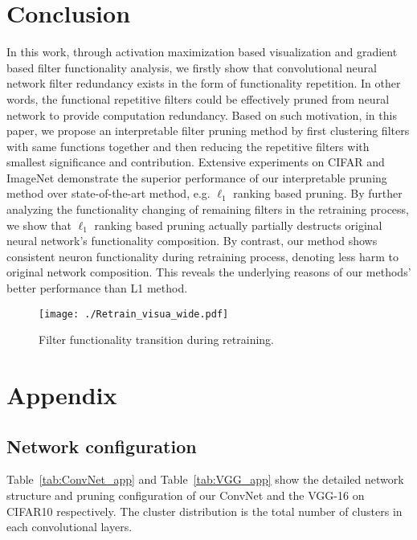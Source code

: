 \documentclass{article} %
\begin{document}
\section{Conclusion}

In this work, through activation maximization based visualization and gradient based filter functionality analysis, we firstly show that convolutional neural network filter redundancy exists in the form of functionality repetition. In other words, the functional repetitive filters could be effectively pruned from neural network to provide computation redundancy. Based on such motivation, in this paper, we propose an interpretable filter pruning method by first clustering filters with same functions together and then reducing the repetitive filters with smallest significance and contribution. Extensive experiments on CIFAR and ImageNet demonstrate the superior performance of our interpretable pruning method over state-of-the-art method, e.g. $\ell_1$ ranking based pruning. By further analyzing the functionality changing of remaining filters in the retraining process, we show that $\ell_1$ ranking based pruning actually partially destructs original neural network's functionality composition. By contrast, our method shows consistent neuron functionality during retraining process, denoting less harm to original network composition. This reveals the underlying reasons of our methods' better performance than L1 method.
\begin{figure}[hb]
  \centering
  \texttt{[image: ./Retrain\_visua\_wide.pdf]}
  \caption{Filter functionality transition during retraining.}
  \label{fig:Retrain_pattern}
  \vspace{-2mm}
\end{figure}




\newpage
\section{Appendix}\subsection{Network configuration}
Table~\ref{tab:ConvNet_app} and Table~\ref{tab:VGG_app} show the detailed network structure and pruning configuration of our ConvNet and the VGG-16 on CIFAR10 respectively.
The cluster distribution is the total number of clusters in each convolutional layers.
\end{document}
